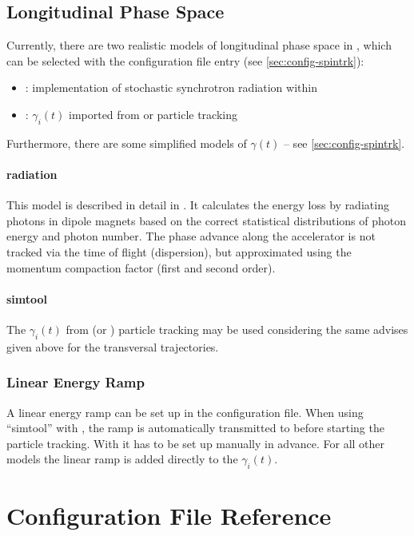 \documentclass[a4paper]{scrartcl}
\begin{document}
\subsection{Longitudinal Phase Space}
\label{sec:concept-gamma}
Currently, there are two realistic models of longitudinal phase space in \polem, which can
be selected with the configuration file entry  (see
\cref{sec:config-spintrk}):
\begin{itemize}
\item {}: implementation of stochastic synchrotron radiation within \polem
\item {}: $\gamma_i(t)$ imported from \ele or \madx particle tracking
\end{itemize}
Furthermore, there are some simplified models of $\gamma(t)$ -- see
\cref{sec:config-spintrk}.

\paragraph{radiation}
This model is described in detail in \cite[section~4.2]{dr}. It
calculates the energy loss by radiating photons in dipole magnets based on the correct
statistical distributions of photon energy and photon number. The phase advance along
the accelerator is not tracked via the time of flight (dispersion), but approximated using
the momentum compaction factor (first and second order).

\paragraph{simtool}
The $\gamma_i(t)$ from \ele (or \madx) particle tracking may be used considering the same advises
given above for the transversal trajectories.



\subsubsection{Linear Energy Ramp}
A linear energy ramp can be set up in the \polem configuration file. When using
 \enquote{simtool} with \ele, the ramp is automatically
transmitted to \ele before starting the particle tracking. With \madx it has to be set up
manually in advance. For all other models the linear ramp is added directly to the
$\gamma_i(t)$.


\clearpage
\section{Configuration File Reference}
\label{sec:config}
\end{document}
